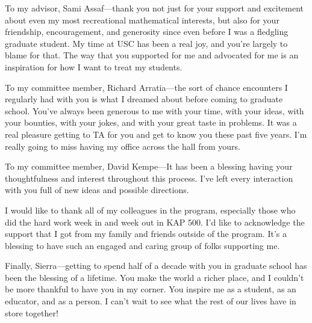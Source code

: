 To my advisor, Sami Assaf---thank you not just for your support and excitement
about even my most recreational mathematical interests, but also for your
friendship, encouragement, and generosity since even before I was a fledgling
graduate student. My time at USC has been a real joy, and you're largely to
blame for that. The way that you supported for me and advocated for me is
an inspiration for how I want to treat my students.

To my committee member, Richard Arratia---the sort of chance encounters I
regularly had with you is what I dreamed about before coming to graduate school.
You've always been generous to me with your time, with your ideas, with your
bounties, with your jokes, and with your great taste in problems.
It was a real pleasure getting to TA for you and get to know you these past five years.
I'm really going to miss having my office across the hall from yours.

To my committee member, David Kempe---It has been a blessing having your
thoughtfulness and interest throughout this process.
I've left every interaction with you full of new ideas and possible directions.

I would like to thank all of my colleagues in the program,
especially those who did the hard work week in and week out in KAP 500.
I'd like to acknowledge the support that I got from my family and friends
outside of the program. It's a blessing to have such an engaged and caring
group of folks supporting me.

Finally, Sierra---getting to spend half of a decade with you in graduate school
has been the blessing of a lifetime. You make the world a richer place, and I
couldn't be more thankful to have you in my corner.
You inspire me as a student, as an educator, and as a person.
I can't wait to see what the rest of our lives have in store together!
